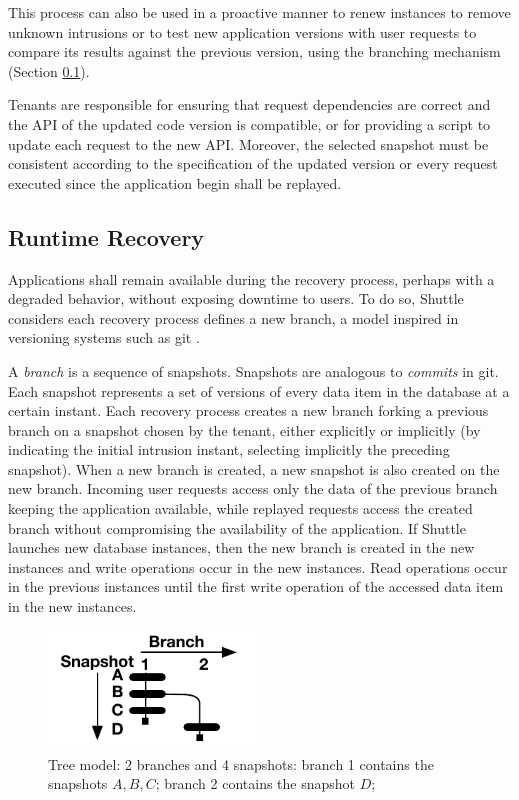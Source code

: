 This process can also be used in a proactive manner to renew instances to remove unknown intrusions \cite{Castro2002,Sousa2010} or to test new application versions with user requests to compare its results against the previous version, using the branching mechanism  (Section \ref{sec:arch:runtime_recovery}).

Tenants are responsible for ensuring that request dependencies are correct and the {API} of the updated code version is compatible, or for providing a script to update each request to the new \ac{API}. Moreover, the selected snapshot must be consistent according to the specification of the updated version or every request executed since the application begin shall be replayed.



\subsection{Runtime Recovery}
\label{sec:arch:runtime_recovery}

Applications shall remain available during the recovery process, perhaps with a degraded behavior, without exposing downtime to users. To do so, Shuttle considers each recovery process defines a new branch, a model inspired in versioning systems such as git \cite{git}.

A \emph{branch} is a sequence of snapshots. Snapshots are analogous to \textit{commits} in git. Each snapshot represents a set of versions of every data item in the database at a certain instant. Each recovery process creates a new branch forking a previous branch on a snapshot chosen by the tenant, either explicitly or implicitly (by indicating the initial intrusion instant, selecting implicitly the preceding snapshot). When a new branch is created, a new snapshot is also created on the new branch. Incoming user requests access only the data of the previous branch keeping the application available, while replayed requests access the created branch without compromising the availability of the application. If Shuttle launches new database instances, then the new branch is created in the new instances and write operations occur in the new instances. Read operations occur in the previous instances until the first write operation of the accessed data item in the new instances.

\begin{figure}
\centering
\includegraphics[width=55mm]{images/branches_paper}
\caption[Tree model]{Tree model: 2 branches and 4 snapshots: branch 1 contains the snapshots $A, B, C$; branch 2 contains the snapshot $D$;}
\label{fig:branches_simple}
\end{figure}


